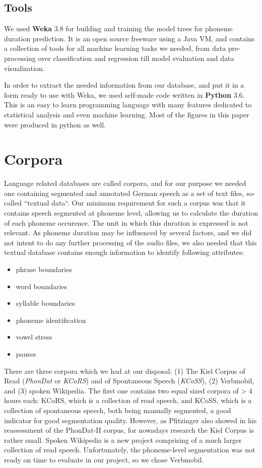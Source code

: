 \documentclass[11pt,a4paper]{scrbook}
\begin{document}
\section{Tools}
We used \textbf{Weka} 3.8 for building and training the model trees for phoneme duration prediction. It is an open source freeware using a Java VM, and contains a collection of tools for all machine learning tasks we needed, from data pre-processing over classification and regression till model evaluation and data visualization.

In order to extract the needed information from our database, and put it in a form ready to use with Weka, we used self-made code written in \textbf{Python} 3.6. This is an easy to learn programming language with many features dedicated to statistical analysis and even machine learning. Most of the figures in this paper were produced in python as well.

\chapter{Corpora}
\label{chap_3}
Language related databases are called corpora, and for our purpose we needed one containing segmented and annotated German speech as a set of text files, so-called ``textual data``. Our minimum requirement for such a corpus was that it contains speech segmented at phoneme level, allowing us to calculate the duration of each phoneme occurence. The unit in which this duration is expressed is not relevant. As phoneme duration may be influenced by several factors, and we did not intent to do any further processing of the audio files, we also needed that this textual database contains enough information to identify following attributes: 

\begin{itemize}
	\item phrase boundaries
	\item word boundaries
	\item syllable boundaries
	\item phoneme identification
	\item vowel stress
	\item pauses
\end{itemize}

There are three corpora which we had at our disposal: (1) The Kiel Corpus of Read (\textit{PhonDat} or \textit{KCoRS}) and of Spontaneous Speech (\textit{KCoSS}), (2) Verbmobil, and (3) spoken Wikipedia. The first one contains two equal sized corpora of > 4 hours each: KCoRS, which is a collection of read speech, and KCoSS, which is a collection of spontaneous speech, both being manually segmented, a good indicator for good segmentation quality. However, as Pfitzinger \cite{Pfitzinger2002} also showed in his reassessment of the PhonDat-II corpus, for nowadays research the Kiel Corpus is rather small. Spoken Wikipedia is a new project comprising of a much larger collection of read speech. Unfortunately, the phoneme-level segmentation was not ready on time to evaluate in our project, so we chose Verbmobil.
\end{document}
